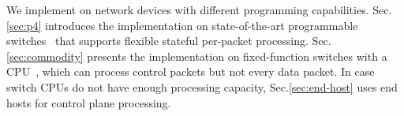 

We implement \sys on network devices with different programming capabilities. Sec.\ref{sec:p4} introduces the implementation on state-of-the-art programmable switches~\cite{tofino,cavium} that supports flexible stateful per-packet processing. Sec.\ref{sec:commodity} presents the implementation on fixed-function switches with a CPU~\cite{arista}, which can process control packets but not every data packet. In case switch CPUs do not have enough processing capacity, Sec.\ref{sec:end-host} uses end hosts for control plane processing.


